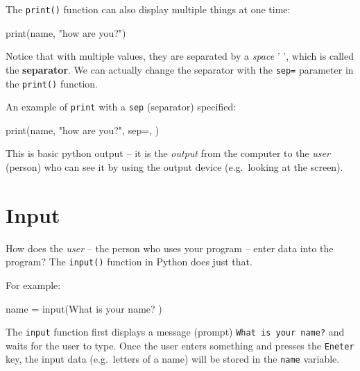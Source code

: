 \documentclass[
  letterpaper,
]{scrbook}
\newenvironment{Shaded}{\begin{snugshade}}{\end{snugshade}}
\newcommand{\BuiltInTok}[1]{\textcolor[rgb]{0.00,0.23,0.31}{#1}}
\newcommand{\NormalTok}[1]{\textcolor[rgb]{0.00,0.23,0.31}{#1}}
\newcommand{\OperatorTok}[1]{\textcolor[rgb]{0.37,0.37,0.37}{#1}}
\newcommand{\StringTok}[1]{\textcolor[rgb]{0.13,0.47,0.30}{#1}}
\begin{document}
The \texttt{print()} function can also display multiple things at one
time:

\begin{Shaded}
\begin{Highlighting}[]
\BuiltInTok{print}\NormalTok{(name, }\StringTok{"how are you?"}\NormalTok{)}
\end{Highlighting}
\end{Shaded}

Notice that with multiple values, they are separated by a \emph{space} '
', which is called the \textbf{separator}. We can actually change the
separator with the \texttt{sep=} parameter in the \texttt{print()}
function.

An example of \texttt{print} with a \texttt{sep} (separator) specified:

\begin{Shaded}
\begin{Highlighting}[]
\BuiltInTok{print}\NormalTok{(name, }\StringTok{"how are you?"}\NormalTok{, sep}\OperatorTok{=}\StringTok{\textquotesingle{}, \textquotesingle{}}\NormalTok{)}
\end{Highlighting}
\end{Shaded}

This is basic python output -- it is the \emph{output} from the computer
to the \emph{user} (person) who can see it by using the output device
(e.g.~looking at the screen).

\section*{Input}\label{input}


How does the \emph{user} -- the person who uses your program -- enter
data into the program? The \texttt{input()} function in Python does just
that.

For example:

\begin{Shaded}
\begin{Highlighting}[]
\NormalTok{name }\OperatorTok{=} \BuiltInTok{input}\NormalTok{(}\StringTok{\textquotesingle{}What is your name? \textquotesingle{}}\NormalTok{)}
\end{Highlighting}
\end{Shaded}

The \texttt{input} function first displays a message (prompt)
\texttt{What\ is\ your\ name?} and waits for the user to type. Once the
user enters something and presses the \texttt{Eneter} key, the input
data (e.g.~letters of a name) will be stored in the \texttt{name}
variable.
\end{document}
